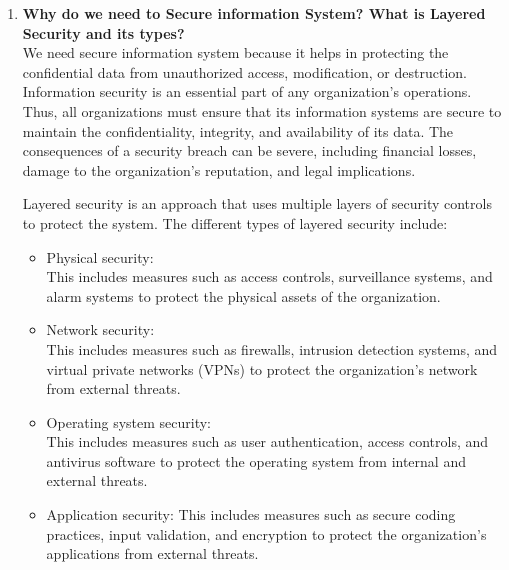 \documentclass[12pt]{article}
\begin{document}
\begin{enumerate}
    \item {\bfseries Why do we need to Secure information System? What is Layered Security and its types?\\}
    We need secure information system because it helps in protecting the confidential data from unauthorized access, modification, or destruction. Information security is an essential part of any organization's operations. Thus, all organizations must ensure that its information systems are secure to maintain the confidentiality, integrity, and availability of its data. The consequences of a security breach can be severe, including financial losses, damage to the organization's reputation, and legal implications.

    Layered security is an approach that uses multiple layers of security controls to protect the system. The different types of layered security include:
    \begin{itemize}
        \item Physical security: \\This includes measures such as access controls, surveillance systems, and alarm systems to protect the physical assets of the organization.
        \item Network security:\\ This includes measures such as firewalls, intrusion detection systems, and virtual private networks (VPNs) to protect the organization's network from external threats.
        \item  Operating system security:\\ This includes measures such as user authentication, access controls, and antivirus software to protect the operating system from internal and external threats.
        \item Application security: This includes measures such as secure coding practices, input validation, and encryption to protect the organization's applications from external threats.
    \end{itemize}


\end{enumerate}
\end{document}
